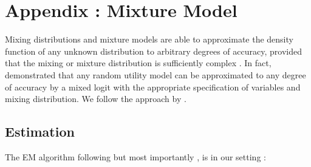 \documentclass[oneside,11pt]{article}
\begin{document}
\newpage
\section{Appendix : Mixture Model}
Mixing distributions and mixture models are able to approximate the density function of any unknown distribution to arbitrary degrees of accuracy, provided that the mixing or mixture distribution  is  sufficiently  complex \cite{nguyen}. In fact, \cite{mcfadden} demonstrated that any random utility model can be approximated to any degree of accuracy by a mixed logit with the appropriate specification of variables and mixing distribution. We follow the approach by \cite{TRAIN200840}.\\



\subsection{Estimation}

The EM algorithm following \cite{em,em_seq} but most importantly \cite{TRAIN200840}, is in our setting :
\end{document}
